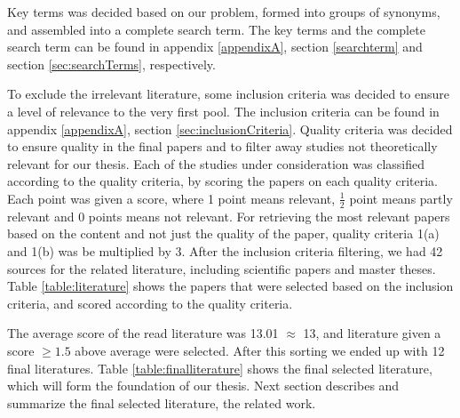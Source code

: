 Key terms was decided based on our problem, formed into groups of synonyms, and assembled into a complete search term. The key terms and the complete search term can be found in appendix \ref{appendixA}, section \vref{searchterm} and section \vref{sec:searchTerms}, respectively.

To exclude the irrelevant literature, some inclusion criteria was decided to ensure a level of relevance to the very first pool. The inclusion criteria can be found in appendix \ref{appendixA}, section \vref{sec:inclusionCriteria}. Quality criteria was decided to ensure quality in the final papers and to filter away studies not theoretically relevant for our thesis. Each of the studies under consideration was classified according to the quality criteria, by scoring the papers on each quality criteria. Each point was given a score, where 1 point means relevant, $\frac{1}{2}$ point means partly relevant and 0 points means not relevant. For retrieving the most relevant papers based on the content and not just the quality of the paper, quality criteria 1(a) and 1(b) was be multiplied by 3. After the inclusion criteria filtering, we had 42 sources for the related literature, including scientific papers and master theses. Table \vref{table:literature} shows the papers that were selected based on the inclusion criteria, and scored according to the quality criteria. 

The average score of the read literature was 13.01 $\approx$ 13, and literature given a score $\geq{1.5}$ above average were selected. After this sorting we ended up with 12 final literatures. Table \vref{table:finalliterature} shows the final selected literature, which will form the foundation of our thesis. Next section describes and summarize the final selected literature, the related work.
